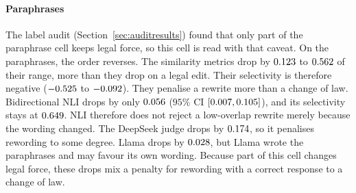 \documentclass{BVP_JCLLT}
\newcommand{\rev}[1]{#1}
\newcommand{\rev}[1]{{\color{revcol}#1}}
\begin{document}
{\paragraph{Paraphrases}
The label audit (Section~\ref{sec:auditresults}) found that only part of the
paraphrase cell keeps legal force, so this cell is read with that caveat.
On the paraphrases, the order reverses. The similarity metrics drop by
$0.123$ to $0.562$ of their range, more than they drop on a
legal edit. Their selectivity is therefore negative ($-0.525$ to
$-0.092$). They penalise a rewrite more than a change of law.
Bidirectional NLI drops by only $0.056$ ($95\%$ CI $[0.007,
0.105]$), and its selectivity stays at $0.649$. NLI therefore
does not reject a low-overlap rewrite merely because the wording changed. The
DeepSeek judge drops by $0.174$, so it penalises rewording to some
degree. Llama drops by $0.028$, but Llama wrote the paraphrases and may
favour its own wording. Because part of this cell changes legal force, these
drops mix a penalty for rewording with a correct response to a change of law.}

\begin{table}
\centering
\caption{\rev{Specificity. \emph{\textsc{LexFlip} margin} is computed on the
sources that carry a neutral edit. \emph{Drop} is the share of the same
identical-to-unrelated range lost on a force-preserving edit (ideal $0$), and
\emph{select.}\ is margin minus drop on the same sources (higher is better).
Neutral edits keep the overlap of \textsc{LexFlip}. Paraphrases have low
overlap.}}\label{tab:specificity}
\footnotesize
\rev{\resizebox{\columnwidth}{!}{}}
\end{table}
\end{document}
